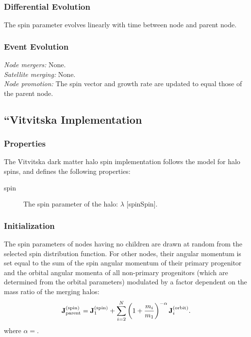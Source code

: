 \subsubsection{Differential Evolution}

The spin parameter evolves linearly with time between \gls{node} and parent node.

\subsubsection{Event Evolution}

\noindent\emph{Node mergers:} None.\\

\noindent\emph{Satellite merging:} None.\\

\noindent\emph{Node promotion:} The spin vector and growth rate are updated to equal those of the parent node.\\

\subsection{``Vitvitska Implementation}

\subsubsection{Properties}

The Vitvitska dark matter halo spin implementation follows the \cite{vitvitska_origin_2002} model for halo spins, and defines the following properties:
\begin{description}
 \item [{\normalfont \ttfamily spin}] The spin parameter of the halo: $\lambda$ [{\normalfont \ttfamily spinSpin}].
\end{description}

\subsubsection{Initialization}

The spin parameters of nodes having no children are drawn at random from the selected spin distribution function. For other nodes, their angular momentum is set equal to the sum of the spin angular momentum of their primary progenitor and the orbital angular momenta of all non-primary progenitors (which are determined from the orbital parameters) modulated by a factor dependent on the mass ratio of the merging halos:
\begin{equation}
 \mathbf{J}^\mathrm{(spin)}_\mathrm{parent} = \mathbf{J}^\mathrm{(spin)}_{1} + \sum_{i=2}^N \left(1+{m_i \over m_{1}}\right)^{-\alpha} \mathbf{J}^\mathrm{(orbit)}_{i}.
\end{equation}
where $\alpha=${\normalfont \ttfamily [spinVitvitskaMergerRatioExponent]}. 

